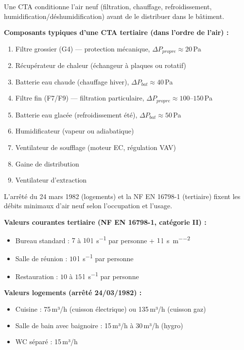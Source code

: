 Une CTA conditionne l'air neuf (filtration, chauffage, refroidissement, humidification/déshumidification) avant de le distribuer dans le bâtiment.

\textbf{Composants typiques d'une CTA tertiaire (dans l'ordre de l'air) :}
\begin{enumerate}
  \item Filtre grossier (G4) — protection mécanique, $\Delta P_{propre} \approx 20$\,Pa
  \item Récupérateur de chaleur (échangeur à plaques ou rotatif)
  \item Batterie eau chaude (chauffage hiver), $\Delta P_{bat} \approx 40$\,Pa
  \item Filtre fin (F7/F9) — filtration particulaire, $\Delta P_{propre} \approx 100$–$150$\,Pa
  \item Batterie eau glacée (refroidissement été), $\Delta P_{bat} \approx 50$\,Pa
  \item Humidificateur (vapeur ou adiabatique)
  \item Ventilateur de soufflage (moteur EC, régulation VAV)
  \item Gaine de distribution
  \item Ventilateur d'extraction
\end{enumerate}

\begin{definition}[title=Débit d'air neuf réglementaire]
L'arrêté du 24 mars 1982 (logements) et la NF EN 16798-1 (tertiaire) fixent les débits minimaux d'air neuf selon l'occupation et l'usage.

\textbf{Valeurs courantes tertiaire (NF EN 16798-1, catégorie II) :}
\begin{itemize}
  \item Bureau standard : $7$ à $10$\,\si{\litre\per\second} par personne + $1$\,\si{\litre\per\second\per\square\metre}
  \item Salle de réunion : $10$\,\si{\litre\per\second} par personne
  \item Restauration : $10$ à $15$\,\si{\litre\per\second} par personne
\end{itemize}

\textbf{Valeurs logements (arrêté 24/03/1982) :}
\begin{itemize}
  \item Cuisine : 75\,m³/h (cuisson électrique) ou 135\,m³/h (cuisson gaz)
  \item Salle de bain avec baignoire : 15\,m³/h à 30\,m³/h (hygro)
  \item WC séparé : 15\,m³/h
\end{itemize}
\end{definition}


